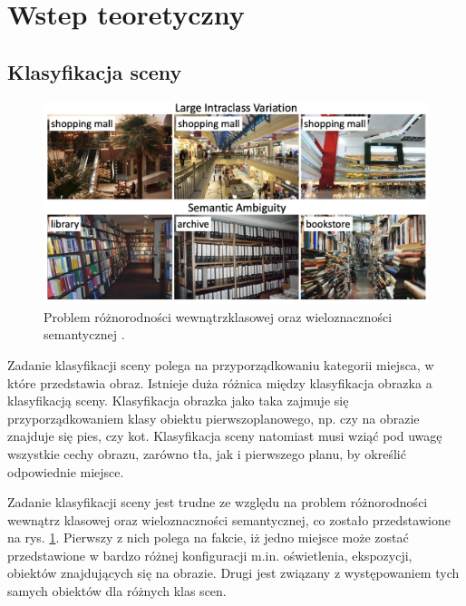 \newpage %
\section{Wstep teoretyczny}


\subsection{Klasyfikacja sceny}
\begin{figure}[ht!]
    \includegraphics[width=\textwidth]{img/scene_class.png}
    \caption{Problem różnorodności wewnątrzklasowej oraz wieloznaczności semantycznej \cite{zeng2021deep}.}
    \label{fig:scene-class}
\end{figure}

Zadanie klasyfikacji sceny polega na przyporządkowaniu kategorii miejsca, w które przedstawia obraz. Istnieje duża różnica między klasyfikacja obrazka a klasyfikacją sceny. Klasyfikacja obrazka jako taka zajmuje się przyporządkowaniem klasy obiektu pierwszoplanowego, np. czy na obrazie znajduje się pies, czy kot. Klasyfikacja sceny natomiast musi wziąć pod uwagę wszystkie cechy obrazu, zarówno tła, jak i pierwszego planu, by określić odpowiednie miejsce.

Zadanie klasyfikacji sceny jest trudne ze względu na problem różnorodności wewnątrz klasowej oraz wieloznaczności semantycznej, co zostało przedstawione na rys. \ref{fig:scene-class}. Pierwszy z nich polega na fakcie, iż jedno miejsce może zostać przedstawione w bardzo różnej konfiguracji m.in. oświetlenia, ekspozycji, obiektów znajdujących się na obrazie. Drugi jest związany z występowaniem tych samych obiektów dla różnych klas scen.

